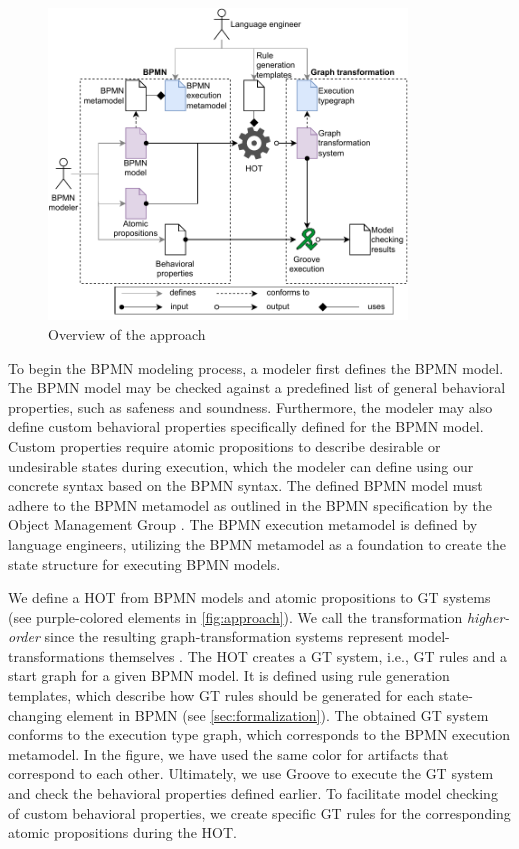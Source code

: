 \documentclass{lmcs} %
\begin{document}
\begin{figure}[ht]
    \centering
    \includegraphics[width=0.85\textwidth]{images/bpmn_semantics-overview.pdf}
    \caption{Overview of the approach}
    \label{fig:approach}
\end{figure}

To begin the BPMN modeling process, a modeler first defines the BPMN model. 
The BPMN model may be checked against a predefined list of general behavioral properties, such as safeness and soundness.
Furthermore, the modeler may also define custom behavioral properties specifically defined for the BPMN model.
Custom properties require atomic propositions to describe desirable or undesirable states during execution, which the modeler can define using our concrete syntax based on the BPMN syntax.
The defined BPMN model must adhere to the BPMN metamodel as outlined in the BPMN specification by the Object Management Group \cite{objectmanagementgroupBusinessProcessModel2013}.
The BPMN execution metamodel is defined by language engineers, utilizing the BPMN metamodel as a foundation to create the state structure for executing BPMN models. 

We define a HOT from BPMN models and atomic propositions to GT systems (see purple-colored elements in \autoref{fig:approach}).
We call the transformation \textit{higher-order} since the resulting graph-transformation systems represent model-transformations themselves \cite{tisiUseHigherOrderModel2009}.
The HOT creates a GT system, i.e., GT rules and a start graph for a given BPMN model.
It is defined using rule generation templates, which describe how GT rules should be generated for each state-changing element in BPMN (see \autoref{sec:formalization}).
The obtained GT system conforms to the execution type graph, which corresponds to the BPMN execution metamodel.
In the figure, we have used the same color for artifacts that correspond to each other.
Ultimately, we use Groove to execute the GT system and check the behavioral properties defined earlier.
To facilitate model checking of custom behavioral properties, we create specific GT rules for the corresponding atomic propositions during the HOT.
\end{document}
